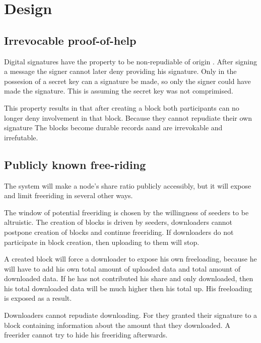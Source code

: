 \chapter{Design}





\section{Irrevocable proof-of-help}
Digital signatures have the property to be non-repudiable of origin \cite{VanderLubbe-crypto}.
After signing a message the signer cannot later deny providing his signature.
Only in the possesion of a secret key can a signature be made,
so only the signer could have made the signature.
This is assuming the secret key was not comprimised.

This property results in that after creating a block
both participants can no longer deny involvement in that block.
Because they cannot repudiate their own signature
The blocks become durable records aand are irrevokable and irrefutable.

\section{Publicly known free-riding}
The system will make a node's share ratio publicly accessibly,
but it will expose and limit freeriding in several other ways.

The window of potential freeriding is chosen by the willingness of seeders to be altruistic.
The creation of blocks is driven by seeders,
downloaders cannot postpone creation of blocks and continue freeriding.
If downloaders do not participate in block creation,
then uploading to them will stop.

A created block will force a downloader to expose his own freeloading,
because he will have to add his own total amount of uploaded data and total amount of downloaded data.
If he has not contributed his share and only downloaded,
then his total downloaded data will be much higher then his total up.
His freeloading is exposed as a result.

Downloaders cannot repudiate downloading.
For they granted their signature to a block containing information about the amount that they downloaded.
A freerider cannot try to hide his freeriding afterwards.


